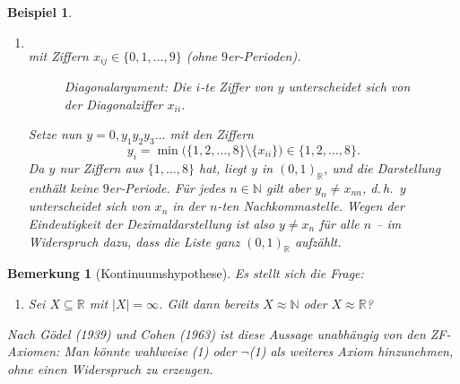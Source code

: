 \documentclass[a4paper]{article}
\makeatletter
\theoremstyle{kurzskript}
\newtheorem{bemerkung}[satz]{Bemerkung}
\newtheorem{beispiel}[satz]{Beispiel}
\renewenvironment{proof}[1][\proofname]{\par\pushQED{\qed}%
  \normalfont\topsep\medskipamount\relax
  \trivlist\item[\hskip\labelsep\bfseries #1\@addpunct{.}]\ignorespaces}%
  {\popQED\endtrivlist\@endpefalse}
\renewcommand{\proofname}{Beweis}
\newcommand{\N}{\mathbb{N}}
\newcommand{\R}{\mathbb{R}}
\makeatother
\begin{document}
\begin{beispiel}
\begin{enumerate}[label=(\alph*)]
\begin{proof}
\begin{align*}
  \end{align*}
  mit Ziffern $x_{ij} \in \{0, 1, \dots, 9\}$ (ohne $9$er-Perioden).
  \begin{figure}[H]
  \centering
  \caption{Diagonalargument: Die $i$-te Ziffer von $y$ unterscheidet sich von der Diagonalziffer $x_{ii}$.}
  \end{figure}
  Setze nun $y = 0{,}y_1y_2y_3\dots$ mit den Ziffern
  \[
    y_i = \min\bigl(\{1, 2, \dots, 8\} \setminus \{x_{ii}\}\bigr) \in \{1, 2, \dots, 8\}.
  \]
  Da $y$ nur Ziffern aus $\{1, \dots, 8\}$ hat, liegt $y$ in $(0, 1)_\R$, und die Darstellung enthält keine $9$er-Periode. Für jedes $n \in \N$ gilt aber $y_n \neq x_{nn}$, d.\,h.\ $y$ unterscheidet sich von $x_n$ in der $n$-ten Nachkommastelle. Wegen der Eindeutigkeit der Dezimaldarstellung ist also $y \neq x_n$ für alle $n$ -- im Widerspruch dazu, dass die Liste ganz $(0, 1)_\R$ aufzählt.
  \end{proof}
\end{enumerate}
\end{beispiel}

\begin{bemerkung}[Kontinuumshypothese]
Es stellt sich die Frage:
\begin{enumerate}[label=(\arabic*)]
  \item Sei $X \subseteq \R$ mit $|X| = \infty$. Gilt dann bereits $X \approx \N$ oder $X \approx \R$?
\end{enumerate}
Nach Gödel (1939) und Cohen (1963) ist diese Aussage \emph{unabhängig} von den ZF-Axiomen: Man könnte wahlweise (1) oder $\neg$(1) als weiteres Axiom hinzunehmen, ohne einen Widerspruch zu erzeugen.
\end{bemerkung}

\end{document}
